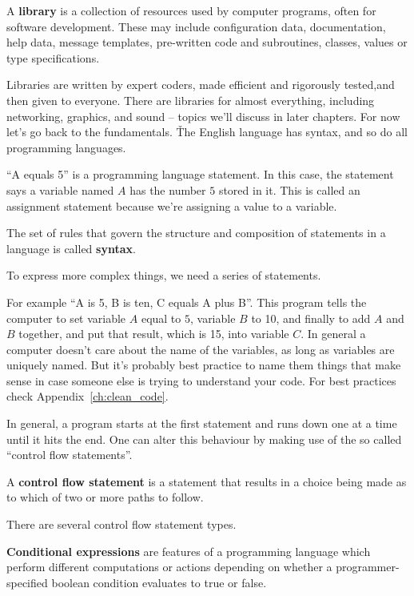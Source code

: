 \bd[Library]
A \textbf{library} is a collection of resources used by computer programs, often for software development. These may
include configuration data, documentation, help data, message templates, pre-written code and subroutines, classes,
values or type specifications.
\ed

Libraries are written by expert coders, made efficient and rigorously tested,and then given to everyone. There are
libraries for almost everything, including networking, graphics, and sound -- topics we'll discuss in later chapters.
For now let's go back to the fundamentals. \v

The English language has syntax, and so do all programming languages.

\be
``A equals 5'' is a programming language statement. In this case, the statement says a variable named $A$ has the number
$5$ stored in it. This is called an assignment statement because we're assigning a value to a variable.
\ee

\bd[Syntax]
The set of rules that govern the structure and composition of statements in a language is called \textbf{syntax}.
\ed

To express more complex things, we need a series of statements.

\be
For example ``A is 5, B is ten, C equals A plus B''. This program tells the computer to set variable $A$ equal to
$5$, variable $B$ to 10, and finally to add $A$ and $B$ together, and put that result, which is 15, into variable $C$.
In general a computer doesn't care about the name of the variables, as long as variables are uniquely named. But
it's probably best practice to name them things that make sense in case someone else is trying to understand your
code. For best practices check Appendix~\ref{ch:clean_code}.
\ee

In general, a program starts at the first statement and runs down one at a time until it hits the end. One can alter
this behaviour by making use of the so called ``control flow statements''.

A \textbf{control flow statement} is a statement that results in a choice being made as to which of two or more paths
to follow.
\ed

There are several control flow statement types.

\textbf{Conditional expressions} are features of a programming language which perform different computations or
actions depending on whether a programmer-specified boolean condition evaluates to true or false.
\ed

